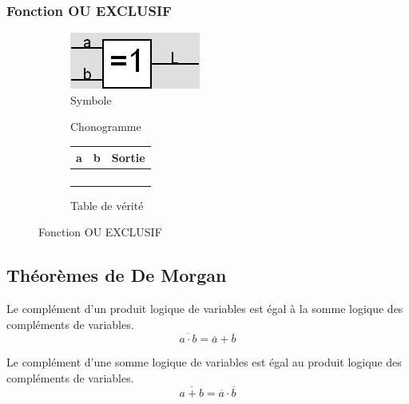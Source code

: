 \documentclass[10pt,fleqn]{article} %
\begin{document}
\subsubsection{Fonction OU EXCLUSIF}
\begin{figure}[ht]
  \begin{subfigure}{.2\textwidth}
    \includegraphics[width=\textwidth]{images/ouex_symb}
    \caption{Symbole}
    \centering
  \end{subfigure}
  \begin{subfigure}{.4\textwidth}
    \centering
    \vspace{3cm}
    \caption{Chonogramme}
  \end{subfigure}
  \begin{subfigure}{.33\textwidth}
    \centering
    \begin{tabular}{|c|c|c|}
      \hline
      \textbf{a}&  \textbf{b}& \textbf{Sortie} \\
      \hline
       & & \\ \hline
       & & \\ \hline
       & & \\ \hline
       & & \\ \hline
    \end{tabular}
    \caption{Table de vérité}
  \end{subfigure}
  \caption{Fonction OU EXCLUSIF}
\end{figure}

\subsection{Théorèmes de De Morgan}
\begin{theorem}
  Le complément d’un produit logique de variables est égal à la somme logique des compléments de variables.
  $$\overline{a \cdot b} = \overline{a} + \overline{b}$$
\end{theorem}

\begin{theorem}
  Le complément d’une somme logique de variables est égal au produit logique des compléments de variables.
  $$\overline{a+b} = \overline{a}\cdot\overline{b}$$
\end{theorem}
\end{document}
